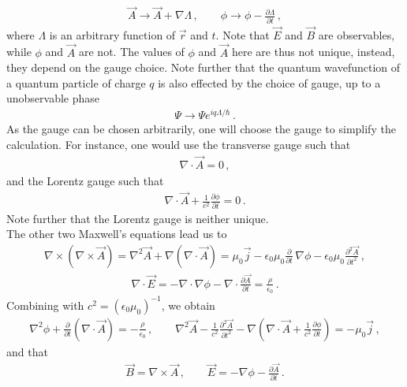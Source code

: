 \documentclass[11pt, onesided]{book}
\theoremstyle{break}
\theoremstyle{break}
\newcommand{\pd}{\partial}
\begin{document}
\begin{align*}
\vec{A} \to \vec{A} + \nabla \Lambda \,,\qquad 
\phi \to \phi -\frac{\pd \Lambda}{\pd t}\,,
\end{align*}
where $\Lambda$ is an arbitrary function of $\vec{r}$ and $t$. Note that $\vec{E}$ and $\vec{B}$ are observables, while $\phi$ and $\vec{A}$ are not. The values of $\phi$ and $\vec{A}$ here are thus not unique, instead, they depend on the gauge choice. Note further that the quantum wavefunction of a quantum particle of charge $q$ is also effected by the choice of gauge, up to a unobservable phase
\begin{align*}
\Psi \to \Psi e^{iq\Lambda/\hbar}\,.
\end{align*}
As the gauge can be chosen arbitrarily, one will choose the gauge to simplify the calculation. For instance, one would use the transverse gauge such that
\begin{align*}
\nabla \cdot \vec{A} = 0\,,
\end{align*}
and the Lorentz gauge such that
\begin{align*}
\nabla \cdot \vec{A} + \frac{1}{c^2} \frac{\pd \phi}{\pd t} = 0\,.
\end{align*}
Note further that the Lorentz gauge is neither unique. \\

The other two Maxwell's equations lead us to
\begin{align*}
\nabla\times (\nabla \times \vec{A}) =\nabla^2 \vec{A} + \nabla(\nabla\cdot \vec{A}) = \mu_0 \vec{j} - \epsilon_0 \mu_0 \frac{\pd}{\pd t}\, \nabla \phi - \epsilon_0 \mu_0 \frac{\pd^2 \vec{A}}{\pd t^2}\,,
\end{align*}
\begin{align*}
\nabla \cdot \vec{E} = -\nabla \cdot \nabla \phi - \nabla \cdot \frac{\pd \vec{A}}{\pd t} = \frac{\rho}{\epsilon_0}\,.
\end{align*}
Combining with $c^2 = (\epsilon_0 \mu_0)^{-1}$, we obtain
\begin{align}
\nabla^2 \phi + \frac{\pd}{\pd t}(\nabla \cdot \vec{A}) =-\frac{\rho}{\epsilon_0}\,,
\qquad
\nabla^2 \vec{A} - \frac{1}{c^2}\frac{\pd^2 \vec{A}}{\pd t^2} - \nabla\left( \nabla \cdot \vec{A} + \frac{1}{c^2}\frac{\pd \phi}{\pd t}\right)  = -\mu_0 \vec{j}\,,
\end{align}
and that
\begin{align}
\vec{B} = \nabla \times \vec{A}\,,
\qquad
\vec{E} = -\nabla \phi - \frac{\pd \vec{A}}{\pd t}\,.
\end{align}
\end{document}
